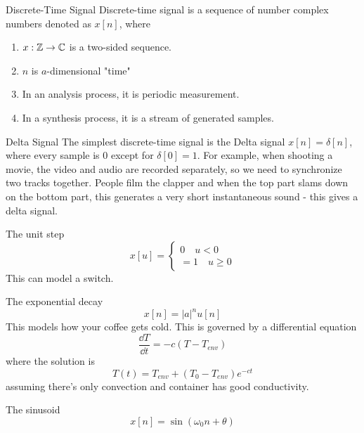 \documentclass[../main.tex]{subfiles}
\begin{document}
\begin{gbox}{Discrete-Time Signal}
Discrete-time signal is a sequence of number complex numbers denoted as $x[n]$,
where \begin{enumerate}
    \item $x:\mathbb{Z} \to \mathbb{C}$ is a two-sided sequence.
    \item $n$ is $a$-dimensional "time"
    \item In an analysis process, it is periodic measurement.
    \item In a synthesis process, it is a stream of generated samples.
\end{enumerate}
\end{gbox}
\begin{pbox}{Delta Signal}
    The simplest discrete-time signal is the Delta signal $x[n]=\delta[n]$, where every sample is $0$ except for $\delta[0]=1$. For example, when shooting a movie, the video and audio are recorded separately, so we need to synchronize two tracks together.
    People film the clapper and when the top part slams down on the bottom part, this generates a very short instantaneous sound - this gives a delta signal.
\end{pbox}
\begin{pbox}{The unit step}
    \[
    x[u] = \begin{cases}
        0 \quad u<0\\
        =1 \quad u\geq 0
    \end{cases}
    \]
    This can model a switch.
\end{pbox}
\begin{pbox}{The exponential decay}
    \[
    x[n] = |a|^n u[n]
    \]
    This models how your coffee gets cold. This is governed by a differential equation \[
    \frac{\dd T}{\dd t}=-c(T-T_{env})
    \] where the solution is \[
    T(t)=T_{env}+(T_0-T_{env})e^{-ct}
    \] assuming there's only convection and container has good conductivity.
\end{pbox}
\begin{pbox}{The sinusoid}
    \[
    x[n] = \sin(\omega_0 n +\theta)
    \]
\end{pbox}
\end{document}
